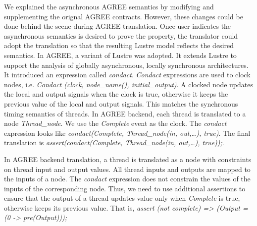 We explained the asynchronous AGREE semantics by modifying and supplementing the orignal AGREE contracts. However, these changes could be done behind the scene during AGREE translation. Once user indicates the asynchronous semantics is desired to prove the property, the translator could adopt the translation so that the resulting Lustre model reflects the desired semantics. In AGREE, a variant of Lustre \cite{GAO2008111} was adopted. It extends Lustre to support the analysis of globally asynchronous, locally synchronous architectures. It introduced an expression called \emph{condact}. \emph{Condact} expressions are used to clock nodes, i.e. \emph{Condact (clock, node\_name(), initial\_output)}. A clocked node updates the local and output signals when the clock is true, otherwise it keeps the previous value of the local and output signals. This matches the synchronous timing semantics of threads. In AGREE backend, each thread is translated to a node \emph{Thread\_node}. We use the \emph{Complete} event as the clock. The \emph{condact} expression looks like \emph{condact(Complete, Thread\_node(in, out,…), true)}. The final translation is \emph{assert(condact(Complete, Thread\_node(in, out,…), true));}. 

In AGREE backend translation, a thread is translated as a node with constraints on thread input and output values. All thread inputs and outputs are mapped to the inputs of a node. The \emph{condact} expression does not constrain the values of the inputs of the corresponding node. Thus, we need to use additional assertions to ensure that the output of a thread updates value only when \emph{Complete} is true, otherwise keeps its previous value. That is, \emph{assert (not complete) => (Output = (0 -> pre(Output)));}

